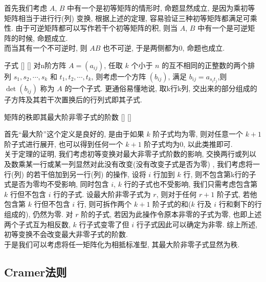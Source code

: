 \documentclass[UTF8]{ctexart}
\DeclareMathOperator{\0}{\mathbf{0}}
\DeclareMathOperator{\<}{\langle}
\renewcommand{\>}{\rangle}
\begin{document}
    \begin{prf}
        首先我们考虑 \(A\), \(B\) 中有一个是初等矩阵的情形时, 命题显然成立, 是因为乘初等矩阵相当于进行行(列) 变换, 根据上述的定理, 容易验证三种初等矩阵都满足可乘性. 由于可逆矩阵都可以写作若干个初等矩阵的积, 则当 \(A\), \(B\) 中有一个是可逆矩阵的时候, 命题成立.\\
        而当其有一个不可逆时, 则 \(AB\) 也不可逆, 于是两侧都为0, 命题也成立.
        
    \end{prf}
    \begin{dfn}
			[]
			{子式}
			[]
			[]
        对n阶方阵 \(A=(a_{ij})\), 任取 \(k\) 个小于 \(n\) 的互不相同的正整数的两个排列 \(s_{1},s_2,\cdots,s_k\) 和 \(t_1,t_2,\cdots,t_k\), 则考虑一个方阵 \((b_{ij})\), 满足 \(b_{ij}=a_{s_it_j}\),则 \(\det(b_{ij})\) 称为 \(A\) 的一个子式. 更通俗易懂地说, 取k行k列, 交出来的部分组成的子方阵及其若干次置换后的行列式即其子式.
    \end{dfn}
    \begin{thm}
			[]
			{矩阵的秩即其最大阶非零子式的阶数}
			[]
			[]
    \end{thm}
    \begin{prf}
        首先“最大阶”这个定义是良好的, 是由于如果 \(k\) 阶子式均为零, 则对任意一个 \(k+1\) 阶子式进行展开, 也可以得到任何一个 \(k+1\) 阶子式均为0, 以此类推即可.\\
        关于定理的证明, 我们考虑初等变换对最大非零子式阶数的影响, 交换两行或列以及数乘某一行或某一列显然对此没有改变(没有改变子式是否为零) , 我们考虑将一行(列) 的若干倍加到另一行(列) 的操作, 设将 \(i\) 行加到 \(k\) 行, 则不包含第k行的子式是否为零均不受影响, 同时包含 \(i\), \(k\) 行的子式也不受影响, 我们只需考虑包含第 \(k\) 行但不包含 \(i\) 行的子式. 设最大阶非零子式为 \(r\), 则对于任何 \(r+1\) 阶子式, 若他包含第 \(k\) 行但不包含 \(i\) 行, 则可拆作两个 \(k+1\) 阶子式的和(\(k\) 行及 \(i\) 行和剩下的行组成的), 仍然为零. 对 \(r\) 阶的子式, 若因为此操作令原本非零的子式为零, 也即上述两个子式互为相反数,  \(k\) 行子式变零了但 \(i\) 行子式因此可以确定为非零. 综上所述, 初等变换不会改变最大非零子式的阶数.\\
        于是我们可以考虑将任一矩阵化为相抵标准型, 其最大阶非零子式显然为秩.
    \end{prf}


	\subsection{Cramer法则}
		
\end{document}
